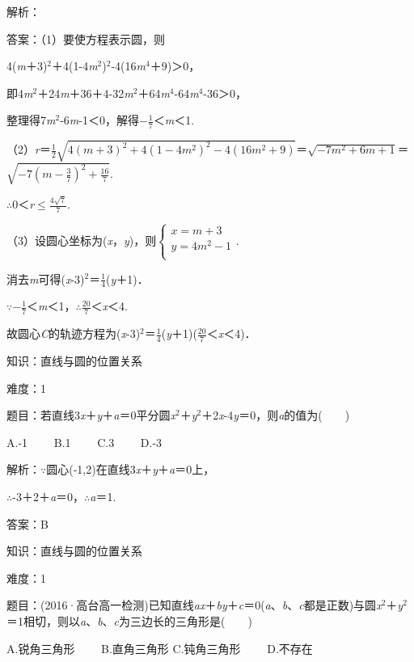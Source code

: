 \documentclass{article} %
\begin{document}
解析：

答案：（1）要使方程表示圆，则

4(\textit{m}＋3)${}^{2}$＋4(1-4\textit{m}${}^{2}$)${}^{2}$-4(16\textit{m}${}^{4}$＋9)＞0，

即4\textit{m}${}^{2}$＋24\textit{m}＋36＋4-32\textit{m}${}^{2}$＋64\textit{m}${}^{4}$-64\textit{m}${}^{4}$-36＞0，

整理得7\textit{m}${}^{2}$-6\textit{m}-1＜0，解得$-\frac{1}{7}$＜\textit{m}＜1.

（2）\textit{r}＝$\frac{1}{2}\sqrt{4(m+3)^2+4(1-4m^2)^2-4(16m^2+9)}$＝$\sqrt{-7m^2+6m+1}$＝$\sqrt{-7(m-\frac{3}{7})^2+\frac{16}{7}}$.

$\mathrm{\therefore}$0＜\textit{r}$\mathrm{\le}\frac{4\sqrt{7}}{7}$.

（3）设圆心坐标为(\textit{x}，\textit{y})，则$\left\{\begin{array}{r} x=m+3\\ y=4m^2-1\\ \end{array} \right.$.

消去\textit{m}可得(\textit{x}-3)${}^{2}$＝$\frac{1}{4}$(\textit{y}＋1)．

$\mathrm{\because}$$-\frac{1}{7}$＜\textit{m}＜1，$\mathrm{\therefore}$$\frac{20}{7}$＜\textit{x}＜4.

故圆心\textit{C}的轨迹方程为(\textit{x}-3)${}^{2}$＝$\frac{1}{4}$(\textit{y}＋1)($\frac{20}{7}$＜\textit{x}＜4)．


知识：直线与圆的位置关系

难度：1

题目：若直线3\textit{x}＋\textit{y}＋\textit{a}＝0平分圆\textit{x}${}^{2}$＋\textit{y}${}^{2}$＋2\textit{x}-4\textit{y}＝0，则\textit{a}的值为(　　)

A.-1　　 B.1　　 C.3　　 D.-3

解析：$\mathrm{\because}$圆心(-1,2)在直线3\textit{x}＋\textit{y}＋\textit{a}＝0上，

$\mathrm{\therefore}$-3＋2＋\textit{a}＝0，$\mathrm{\therefore}$\textit{a}＝1.

答案：B

知识：直线与圆的位置关系

难度：1

题目：(2016·高台高一检测)已知直线\textit{ax}＋\textit{by}＋\textit{c}＝0(\textit{a}、\textit{b}、\textit{c}都是正数)与圆\textit{x}${}^{2}$＋\textit{y}${}^{2}$＝1相切，则以\textit{a}、\textit{b}、\textit{c}为三边长的三角形是(　　)

A.锐角三角形　　 B.直角三角形  C.钝角三角形　　 D.不存在
\end{document}
